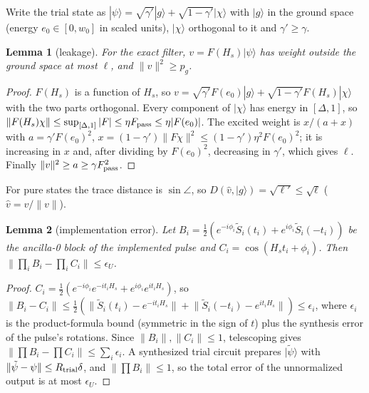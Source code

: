 \documentclass[aps,pra,twocolumn,superscriptaddress,nofootinbib]{revtex4-2}
\newtheorem{lemma}{Lemma}
\newcommand{\ket}[1]{|#1\rangle}
\newcommand{\norm}[1]{\lVert#1\rVert}
\begin{document}
Write the trial state as $\ket\psi=\sqrt{\gamma'}\ket g+\sqrt{1-\gamma'}\ket\chi$ with $\ket g$ in the
ground space (energy $e_0\in[0,w_0]$ in scaled units), $\ket\chi$ orthogonal to it and $\gamma'\ge\gamma$.

\begin{lemma}[leakage]\label{lem:leak}
For the exact filter, $v=F(H_s)\ket\psi$ has weight outside the ground space at most $\ell$, and
$\norm v^2\ge p_g$.
\end{lemma}
\begin{proof}
$F(H_s)$ is a function of $H_s$, so $v=\sqrt{\gamma'}F(e_0)\ket g+\sqrt{1-\gamma'}F(H_s)\ket\chi$ with
the two parts orthogonal. Every component of $\ket\chi$ has energy in $[\Delta,1]$, so
$\norm{F(H_s)\chi}\le\sup_{[\Delta,1]}|F|\le\eta F_{\rm pass}\le\eta|F(e_0)|$. The excited weight is
$x/(a+x)$ with $a=\gamma'F(e_0)^2$, $x=(1-\gamma')\norm{F\chi}^2\le(1-\gamma')\eta^2F(e_0)^2$; it is
increasing in $x$ and, after dividing by $F(e_0)^2$, decreasing in $\gamma'$, which gives $\ell$.
Finally $\norm v^2\ge a\ge\gamma F_{\rm pass}^2$.
\end{proof}

For pure states the trace distance is $\sin\angle$, so $D(\hat v,\ket g)=\sqrt{\ell'}\le\sqrt\ell$
($\hat v=v/\norm v$).

\begin{lemma}[implementation error]
Let $B_i=\frac12(e^{-i\phi_i}\tilde S_i(t_i)+e^{i\phi_i}\tilde S_i(-t_i))$ be the ancilla-0 block of the
implemented pulse and $C_i=\cos(H_st_i+\phi_i)$. Then
$\norm{\prod_iB_i-\prod_iC_i}\le\epsilon_U$.
\end{lemma}
\begin{proof}
$C_i=\frac12(e^{-i\phi_i}e^{-it_iH_s}+e^{i\phi_i}e^{it_iH_s})$, so
$\norm{B_i-C_i}\le\frac12(\norm{\tilde S_i(t_i)-e^{-it_iH_s}}+\norm{\tilde S_i(-t_i)-e^{it_iH_s}})\le\epsilon_i$,
where $\epsilon_i$ is the product-formula bound (symmetric in the sign of $t$) plus the synthesis error
of the pulse's rotations. Since $\norm{B_i},\norm{C_i}\le1$, telescoping gives
$\norm{\prod B_i-\prod C_i}\le\sum_i\epsilon_i$. A synthesized trial circuit prepares $\ket{\tilde\psi}$
with $\norm{\tilde\psi-\psi}\le R_{\rm trial}\delta$, and $\norm{\prod B_i}\le1$, so the total error of the
unnormalized output is at most $\epsilon_U$.
\end{proof}
\end{document}
